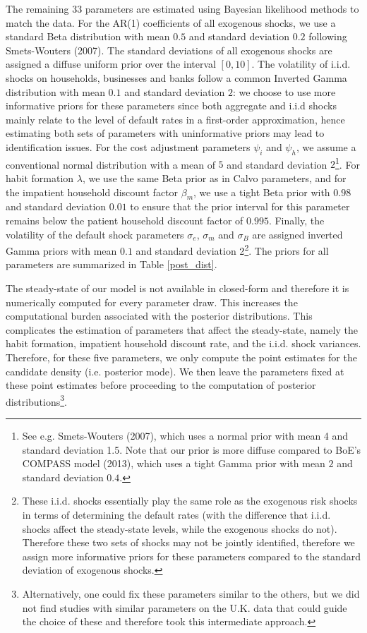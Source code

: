 \documentclass[12pt]{article}
\numberwithin{equation}{section}
\begin{document}
The remaining 33 parameters are estimated using Bayesian likelihood methods to match the data. For the AR(1) coefficients of all exogenous shocks, we use a standard Beta distribution with mean $0.5$ and standard deviation $0.2$ following Smets-Wouters (2007). The standard deviations of all exogenous shocks are assigned a diffuse uniform prior over the interval $[0,10]$. The volatility of i.i.d. shocks on households, businesses and banks follow a common Inverted Gamma distribution with mean $0.1$ and standard deviation $2$: we choose to use more informative priors for these parameters since both aggregate and i.i.d shocks mainly relate to the level of default rates in a first-order approximation, hence estimating both sets of parameters with uninformative priors may lead to identification issues. For the cost adjustment parameters $\psi_i$ and $\psi_h$, we assume a conventional normal distribution with a mean of $5$ and standard deviation $2$\footnote{See e.g. Smets-Wouters (2007), which uses a normal prior with mean 4 and standard deviation 1.5. Note that our prior is more diffuse compared to BoE's COMPASS model (2013), which uses a tight Gamma prior with mean $2$ and standard deviation $0.4$.}. For habit formation $\lambda$, we use the same Beta prior as in Calvo parameters, and for the impatient household discount factor $\beta_m$, we use a tight Beta prior with $0.98$ and standard deviation $0.01$ to ensure that the prior interval for this parameter remains below the patient household discount factor of $0.995$. Finally, the volatility of the default shock parameters $\sigma_e$, $\sigma_m$ and $\sigma_B$ are assigned inverted Gamma priors with mean $0.1$ and standard deviation 2\footnote{These i.i.d. shocks essentially play the same role as the exogenous risk shocks in terms of determining the default rates (with the difference that i.i.d. shocks affect the steady-state levels, while the exogenous shocks do not). Therefore these two sets of shocks may not be jointly identified, therefore we assign more informative priors for these parameters compared to the standard deviation of exogenous shocks.}. The priors for all parameters are summarized in Table \ref{post_dist}. 

The steady-state of our model is not available in closed-form and therefore it is numerically computed for every parameter draw. This increases the computational burden associated with the posterior distributions. This complicates the estimation of parameters that affect the steady-state, namely the habit formation, impatient household discount rate, and the i.i.d. shock variances. Therefore, for these five parameters, we only compute the point estimates for the candidate density (i.e. posterior mode). We then leave the parameters fixed at these point estimates before proceeding to the computation of posterior distributions\footnote{Alternatively, one could fix these parameters similar to the others, but we did not find studies with similar parameters on the U.K. data that could guide the choice of these and therefore took this intermediate approach.}.  
\end{document}
